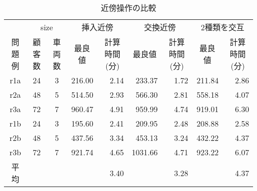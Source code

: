 \documentclass[a4j,11pt,twocolumn]{jsarticle}
\begin{document}
\begin{table*}
 \centering
  \tabcolsep =8pt
  \renewcommand{\arraystretch}{0.8}
  \caption{近傍操作の比較}
  \label{insert}
\begin{tabular}{cccrrrrrr}
\hline
\multicolumn{1}{l}{} & \multicolumn{2}{c}{size} & \multicolumn{2}{c}{挿入近傍}                              & \multicolumn{2}{c}{交換近傍}                              & \multicolumn{2}{c}{2種類を交互}                            \\ \cline{2-9}
問題例                  & 顧客数         & 車両数        & \multicolumn{1}{c}{最良値} & \multicolumn{1}{c}{計算時間(分)} & \multicolumn{1}{c}{最良値} & \multicolumn{1}{c}{計算時間(分)} & \multicolumn{1}{c}{最良値} & \multicolumn{1}{c}{計算時間(分)} \\ \cline{2-9}
r1a                  & 24          & 3          & 216.00                  & 2.14                        & 233.37                  & 1.72                        & 211.84                  & 2.86                        \\
r2a                  & 48          & 5          & 514.50                  & 2.93                        & 566.30                  & 2.81                        & 558.18                  & 4.07                        \\
r3a                  & 72          & 7          & 960.47                  & 4.91                        & 959.99                  & 4.74                        & 919.01                  & 6.30                        \\
r1b                  & 24          & 3          & 195.60                  & 2.41                        & 209.95                  & 2.48                        & 208.88                  & 2.58                        \\
r2b                  & 48          & 5          & 437.56                  & 3.34                        & 453.13                  & 3.24                        & 432.22                & 4.37                        \\
r3b                  & 72          & 7          & 921.74                  & 4.65                        & 1031.66                 & 4.71                        & 923.22                & 6.07                        \\ \hline
平均                   & \multicolumn{1}{l}{} & \multicolumn{1}{l}{} & \multicolumn{1}{l}{}    & 3.40                        &                         & 3.28                        &                         & 4.37                        \\ \hline
\end{tabular}
\end{table*}
\end{document}
